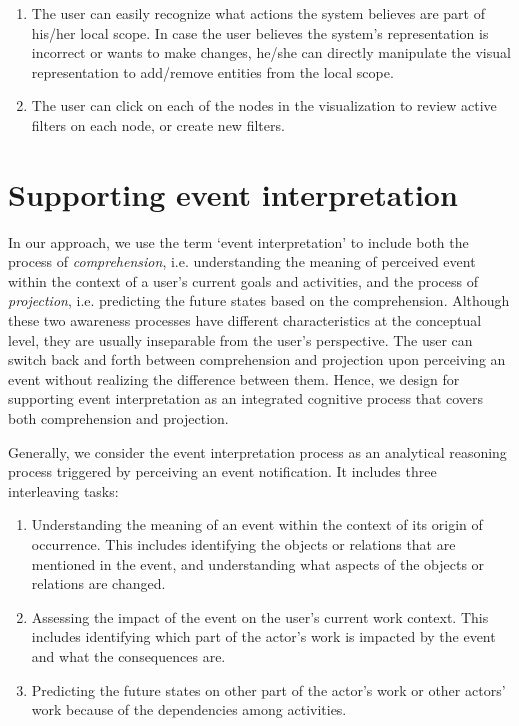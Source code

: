 \begin{enumerate}
	\item The user can easily recognize what actions the system believes are part of his/her local scope. In case the user believes the system's representation is incorrect or wants to make changes, he/she can directly manipulate the visual representation to add/remove entities from the local scope.
	\item The user can click on each of the nodes in the visualization to review active filters on each node, or create new filters. 
\end{enumerate}

\section{Supporting event interpretation} %
\label{sec:supporting_event_interpretation}
In our approach, we use the term `event interpretation' to include both the process of \emph{comprehension}, i.e. understanding the meaning of perceived event within the context of a user's current goals and activities, and the process of \emph{projection}, i.e. predicting the future states based on the comprehension. Although these two awareness processes have different characteristics at the conceptual level, they are usually inseparable from the user's perspective. The user can switch back and forth between comprehension and projection upon perceiving an event without realizing the difference between them. Hence, we design for supporting event interpretation as an integrated cognitive process that covers both comprehension and projection.

Generally, we consider the event interpretation process as an analytical reasoning process triggered by perceiving an event notification. It includes three interleaving tasks:
\begin{enumerate}
	\item Understanding the meaning of an event within the context of its origin of occurrence. This includes identifying the objects or relations that are mentioned in the event, and understanding what aspects of the objects or relations are changed. 
	\item Assessing the impact of the event on the user's current work context. This includes identifying which part of the actor's work is impacted by the event and what the consequences are.
	\item Predicting the future states on other part of the actor's work or other actors' work because of the dependencies among activities.
\end{enumerate}

